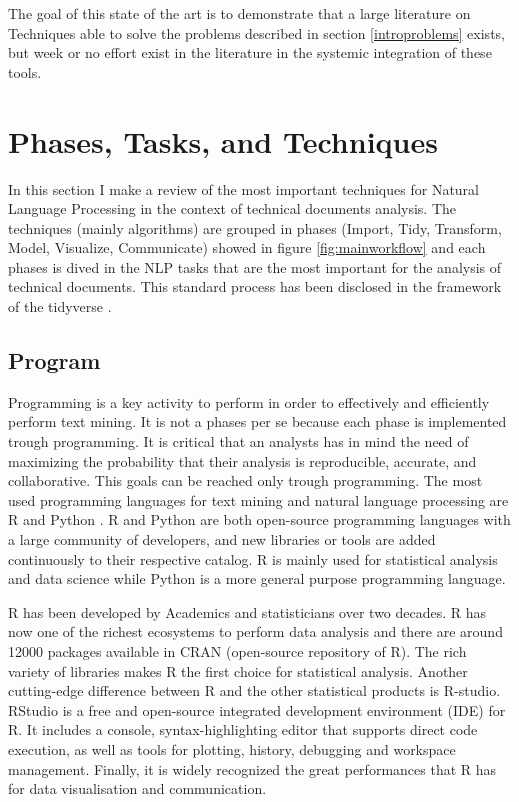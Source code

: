 \documentclass[b5paper,]{book}
\theoremstyle{definition}
\theoremstyle{definition}
\theoremstyle{definition}
\theoremstyle{remark}
\begin{document}
The goal of this state of the art is to demonstrate that a large
literature on Techniques able to solve the problems described in section
\ref{introproblems} exists, but week or no effort exist in the
literature in the systemic integration of these tools.

\chapter{Phases, Tasks, and Techniques}\label{sotatools}

In this section I make a review of the most important techniques for
Natural Language Processing in the context of technical documents
analysis. The techniques (mainly algorithms) are grouped in phases
(Import, Tidy, Transform, Model, Visualize, Communicate) showed in
figure \ref{fig:mainworkflow} and each phases is dived in the NLP tasks
that are the most important for the analysis of technical documents.
This standard process has been disclosed in the framework of the
tidyverse \citep{wickham2016r}.

\section{Program}\label{sotatoolsprogram}

Programming is a key activity to perform in order to effectively and
efficiently perform text mining. It is not a phases per se because each
phase is implemented trough programming. It is critical that an analysts
has in mind the need of maximizing the probability that their analysis
is reproducible, accurate, and collaborative. This goals can be reached
only trough programming. The most used programming languages for text
mining and natural language processing are R \citep{r2008} and Python
\citep{py95}. R and Python are both open-source programming languages
with a large community of developers, and new libraries or tools are
added continuously to their respective catalog. R is mainly used for
statistical analysis and data science while Python is a more general
purpose programming language.

R has been developed by Academics and statisticians over two decades. R
has now one of the richest ecosystems to perform data analysis and there
are around 12000 packages available in CRAN (open-source repository of
R). The rich variety of libraries makes R the first choice for
statistical analysis. Another cutting-edge difference between R and the
other statistical products is R-studio. RStudio is a free and
open-source integrated development environment (IDE) for R. It includes
a console, syntax-highlighting editor that supports direct code
execution, as well as tools for plotting, history, debugging and
workspace management. Finally, it is widely recognized the great
performances that R has for data visualisation and communication.
\end{document}
